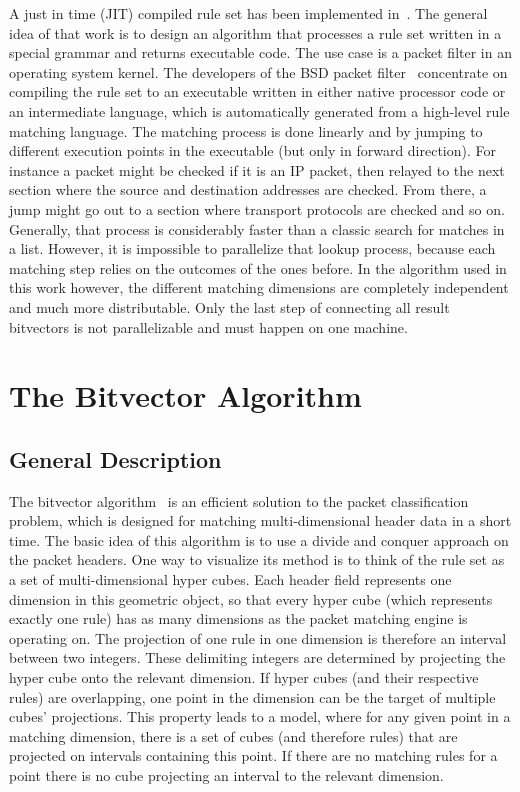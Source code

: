 \documentclass[a4paper,
		12pt,
		parskip=full,
		titlepage
		]{scrartcl}
\begin{document}
A just in time (JIT) compiled rule set has been implemented in~\cite{dpf}.
The general idea of that work is to design an algorithm that processes a rule set
written in a special grammar and returns executable code.
The use case is a packet filter in an operating system kernel.
The developers of the BSD packet filter~\cite{bpf, bpfplus} concentrate on compiling the rule set to an executable written in 
either native processor code or an intermediate language, 
which is automatically generated from a high-level rule matching language.
The matching process is done linearly and by jumping to different execution points in the executable (but only in forward direction).
For instance a packet might be checked if it is an IP packet, then relayed 
to the next section where the source and destination addresses are checked.
From there, a jump might go out to a section where transport protocols are checked and so on.
Generally, that process is considerably faster than a classic search for matches in a list.
However, it is impossible to parallelize that lookup process, because each matching step relies on the outcomes of the ones before.
In the algorithm used in this work however, the different matching dimensions are 
completely independent and much more distributable.
Only the last step of connecting all result bitvectors is not parallelizable and 
must happen on one machine.

\section{The Bitvector Algorithm}
\subsection{General Description}
\label{sec:bv-general}
The bitvector algorithm~\cite{bv} is an efficient solution to the packet 
classification problem, which is designed for matching multi-dimensional header data in a short time.
The basic idea of this algorithm is to use a divide and conquer approach on the packet headers.
One way to visualize its method is to think of the rule set as a set of multi-dimensional hyper cubes.
Each header field represents one dimension in this geometric object, so 
that every hyper cube (which represents exactly one rule) has as many dimensions as the packet matching engine is operating on.
The projection of one rule in one dimension is therefore an interval between two integers.
These delimiting integers are determined by projecting the hyper cube onto the relevant dimension.
If hyper cubes (and their respective rules) are overlapping, one point in the dimension can be the target of multiple cubes' projections. 
This property leads to a model, where for any given point in a matching 
dimension, there is a set of cubes (and therefore rules) that are projected on intervals containing this point.
If there are no matching rules for a point there is no cube projecting an interval to the relevant dimension.
\end{document}

